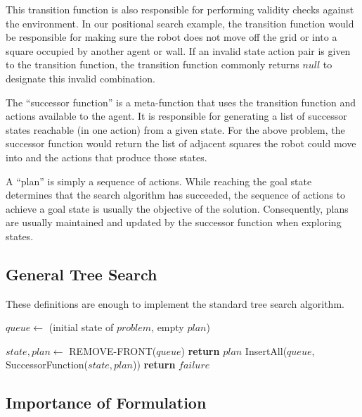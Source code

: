 This transition function is also responsible for performing validity checks against the environment. In our positional search example, the transition function would be responsible for making sure the robot does not move off the grid or into a square occupied by another agent or wall. If an invalid state action pair is given to the transition function, the transition function commonly returns $null$ to designate this invalid combination.

The ``successor function'' is a meta-function that uses the transition function and actions available to the agent. It is responsible for generating a list of successor states reachable (in one action) from a given state. For the above problem, the successor function would return the list of adjacent squares the robot could move into and the actions that produce those states.

A ``plan'' is simply a sequence of actions. While reaching the goal state determines that the search algorithm has succeeded, the sequence of actions to achieve a goal state is usually the objective of the solution. Consequently, plans are usually maintained and updated by the successor function when exploring states.

	\subsection{General Tree Search}

These definitions are enough to implement the standard tree search algorithm.

\begin{algorithm}[H]
\begin{algorithmic}[1]
	\State $queue \gets$ (initial state of $problem$, empty $plan$)

		\State $state, plan \gets$ REMOVE-FRONT($queue$)
			\State \textbf{return} $plan$ 
		\EndIf
		\State InsertAll($queue$, SuccessorFunction($state, plan$)) 
	\EndWhile
	\State \textbf{return} $failure$ 

\EndFunction

\end{algorithmic}
\end{algorithm}

	\subsection{Importance of Formulation}

